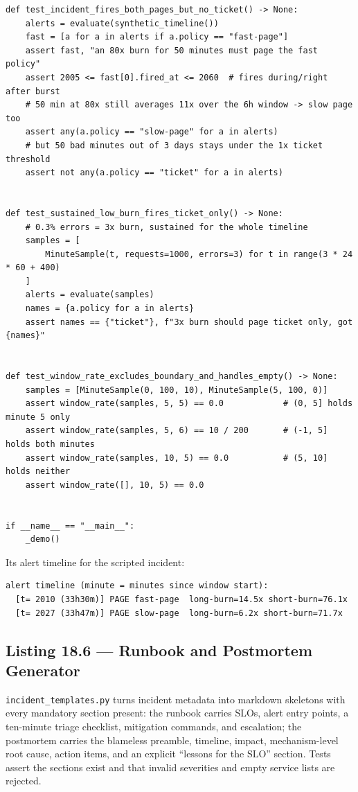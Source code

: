 \begin{verbatim}
def test_incident_fires_both_pages_but_no_ticket() -> None:
    alerts = evaluate(synthetic_timeline())
    fast = [a for a in alerts if a.policy == "fast-page"]
    assert fast, "an 80x burn for 50 minutes must page the fast policy"
    assert 2005 <= fast[0].fired_at <= 2060  # fires during/right after burst
    # 50 min at 80x still averages 11x over the 6h window -> slow page too
    assert any(a.policy == "slow-page" for a in alerts)
    # but 50 bad minutes out of 3 days stays under the 1x ticket threshold
    assert not any(a.policy == "ticket" for a in alerts)


def test_sustained_low_burn_fires_ticket_only() -> None:
    # 0.3% errors = 3x burn, sustained for the whole timeline
    samples = [
        MinuteSample(t, requests=1000, errors=3) for t in range(3 * 24 * 60 + 400)
    ]
    alerts = evaluate(samples)
    names = {a.policy for a in alerts}
    assert names == {"ticket"}, f"3x burn should page ticket only, got {names}"


def test_window_rate_excludes_boundary_and_handles_empty() -> None:
    samples = [MinuteSample(0, 100, 10), MinuteSample(5, 100, 0)]
    assert window_rate(samples, 5, 5) == 0.0            # (0, 5] holds minute 5 only
    assert window_rate(samples, 5, 6) == 10 / 200       # (-1, 5] holds both minutes
    assert window_rate(samples, 10, 5) == 0.0           # (5, 10] holds neither
    assert window_rate([], 10, 5) == 0.0


if __name__ == "__main__":
    _demo()
\end{verbatim}

\noindent Its alert timeline for the scripted incident:

\begin{verbatim}
alert timeline (minute = minutes since window start):
  [t= 2010 (33h30m)] PAGE fast-page  long-burn=14.5x short-burn=76.1x
  [t= 2027 (33h47m)] PAGE slow-page  long-burn=6.2x short-burn=71.7x
\end{verbatim}

\subsection{Listing 18.6 --- Runbook and Postmortem Generator}
\label{subsec:ch18-listing-templates}

\texttt{incident\_templates.py} turns incident metadata into markdown
skeletons with every mandatory section present: the runbook carries SLOs,
alert entry points, a ten-minute triage checklist, mitigation commands, and
escalation; the postmortem carries the blameless preamble, timeline, impact,
mechanism-level root cause, action items, and an explicit ``lessons for the
SLO'' section. Tests assert the sections exist and that invalid severities
and empty service lists are rejected.

